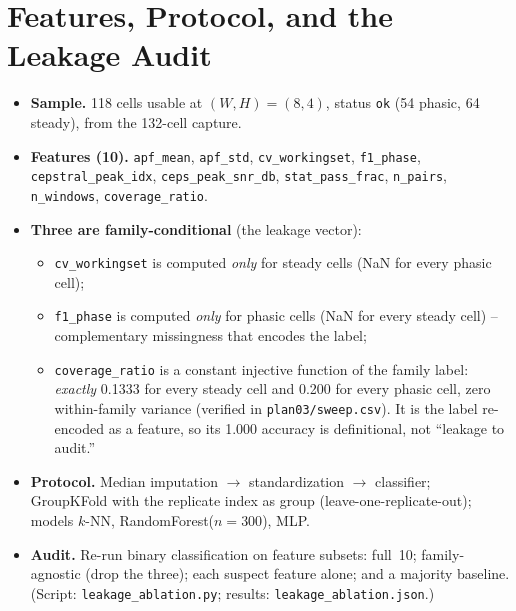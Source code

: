 \documentclass[conference]{IEEEtran}
\begin{document}
\section{Features, Protocol, and the Leakage Audit}
\begin{itemize}
  \item \textbf{Sample.} 118 cells usable at $(W,H)=(8,4)$, status \texttt{ok}
        (54 phasic, 64 steady), from the 132-cell capture.
  \item \textbf{Features (10).} \texttt{apf\_mean}, \texttt{apf\_std},
        \texttt{cv\_workingset}, \texttt{f1\_phase}, \texttt{cepstral\_peak\_idx},
        \texttt{ceps\_peak\_snr\_db}, \texttt{stat\_pass\_frac},
        \texttt{n\_pairs}, \texttt{n\_windows}, \texttt{coverage\_ratio}.
  \item \textbf{Three are family-conditional} (the leakage vector):
    \begin{itemize}
      \item \texttt{cv\_workingset} is computed \emph{only} for steady cells
            (NaN for every phasic cell);
      \item \texttt{f1\_phase} is computed \emph{only} for phasic cells (NaN for
            every steady cell) -- complementary missingness that encodes the
            label;
      \item \texttt{coverage\_ratio} is a constant injective function of the
            family label: \emph{exactly} 0.1333 for every steady cell and 0.200
            for every phasic cell, zero within-family variance (verified in
            \texttt{plan03/sweep.csv}). It is the label re-encoded as a feature,
            so its 1.000 accuracy is definitional, not ``leakage to audit.''
    \end{itemize}
  \item \textbf{Protocol.} Median imputation $\to$ standardization $\to$
        classifier; GroupKFold with the replicate index as group
        (leave-one-replicate-out); models $k$-NN, RandomForest($n{=}300$), MLP.
  \item \textbf{Audit.} Re-run binary classification on feature subsets:
        full~10; family-agnostic (drop the three); each suspect feature alone;
        and a majority baseline. (Script: \texttt{leakage\_ablation.py};
        results: \texttt{leakage\_ablation.json}.)
\end{itemize}
\end{document}
